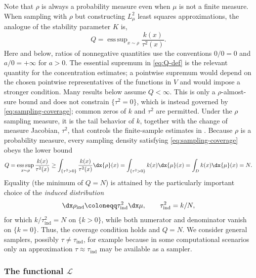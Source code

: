 \documentclass[10pt,dvipsnames]{amsart}
\begin{document}
Note that $\rho$ is always a probability measure even when $\mu$ is not a
finite measure. When sampling with $\rho$ but constructing $L^2_\mu$ least
squares approximations, the analogue of the stability parameter $K$ is,
\begin{equation}\label{eq:Q-def}
    Q
    =
    \mathop{\mathrm{ess\,sup}}_{x\sim\rho}
    \frac{k(x)}{\tau^2(x)}.
\end{equation}
Here and below, ratios of nonnegative quantities use the conventions
\(0/0=0\) and \(a/0=+\infty\) for \(a>0\). The essential supremum in
\eqref{eq:Q-def} is the relevant quantity for the concentration estimates;
a pointwise supremum would depend on the chosen pointwise representatives of
the functions in \(V\) and would impose a stronger condition.
Many results below assume \(Q<\infty\). This is only a \(\rho\)-almost-sure
bound and does not constrain \(\{\tau^2=0\}\), which is instead governed by
\eqref{eq:sampling-coverage}; common zeros of \(k\) and \(\tau^2\) are
permitted.
Under the $\rho$ sampling measure, it is the tail behavior of \(k\), together
with the change of measure Jacobian, \(\tau^2\), that controls the finite-sample estimates in
. Because $\rho$ is a probability measure, every
sampling density satisfying \eqref{eq:sampling-coverage} obeys the lower
bound
\begin{align}
    \label{eq:Q-lower-bound}
    Q
    =
    \mathop{\mathrm{ess\,sup}}_{x\sim\rho}\frac{k(x)}{\tau^2(x)}
    \ge
    \int_{\{\tau^2>0\}} \frac{k(x)}{\tau^2(x)}\dx{\rho}(x)
    =
    \int_{\{\tau^2>0\}} k(x)\dx{\mu}(x)
    =
    \int_D k(x)\dx{\mu}(x)
    =
    N.
\end{align}
Equality (the minimum of $Q = N$) is attained by the particularly important choice of the \emph{induced distribution}
\begin{equation}\label{eq:induced_measure}
\dx \rho_{\mathrm{ind}} \coloneqq \tau_{\mathrm{ind}}^2
\dx \mu, \qquad 
\tau_{\mathrm{ind}}^2=k/N,
\end{equation}
for which \(k/\tau_{\mathrm{ind}}^2=N\) on \(\{k>0\}\), while both
numerator and denominator vanish on \(\{k=0\}\). Thus, the coverage
condition holds and \(Q=N\). We consider general samplers, possibly
$\tau \neq \tau_{\mathrm{ind}}$, for example because in some computational
scenarios only an approximation $\tau \approx \tau_{\mathrm{ind}}$ may be
available as a sampler.

\subsubsection{The functional \(\mathcal L\)}
\label{sssec:preliminaries-L}
\end{document}
